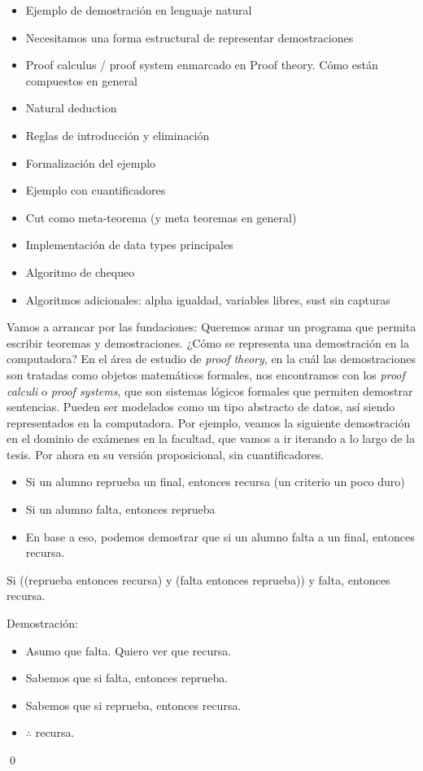 \begin{itemize}
    \item Ejemplo de demostración en lenguaje natural
    \item Necesitamos una forma estructural de representar demostraciones
    \item Proof calculus / proof system enmarcado en Proof theory. Cómo están
    compuestos en general
    \item Natural deduction
    \item Reglas de introducción y eliminación
    \item Formalización del ejemplo
    \item Ejemplo con cuantificadores
    \item Cut como meta-teorema (y meta teoremas en general)
    \item Implementación de data types principales
    \item Algoritmo de chequeo
    \item Algoritmos adicionales: alpha igualdad, variables libres, sust sin capturas
\end{itemize}

Vamos a arrancar por las fundaciones: Queremos armar un programa que permita
escribir teoremas y demostraciones. ¿Cómo se representa una demostración en la
computadora? En el área de estudio de \textit{proof theory}, en la cuál las
demostraciones son tratadas como objetos matemáticos formales, nos encontramos
con los \textit{proof calculi} o \textit{proof systems}, que son sistemas
lógicos formales que permiten demostrar sentencias. Pueden ser modelados como un
tipo abstracto de datos, así siendo representados en la computadora. Por
ejemplo, veamos la siguiente demostración en el dominio de exámenes en la
facultad, que vamos a ir iterando a lo largo de la tesis. Por ahora en su
versión proposicional, sin cuantificadores.

\begin{itemize}
    \item Si un alumno reprueba un final, entonces recursa (un criterio un poco duro)
    \item Si un alumno falta, entonces reprueba
    \item En base a eso, podemos demostrar que si un alumno falta a un final,
    entonces recursa.
\end{itemize}

\begin{ejemplo}\label{nd:ex:exam}
    Si ((reprueba entonces recursa) y (falta entonces reprueba)) y falta, entonces recursa.

    Demostración:
\begin{itemize}
    \item Asumo que falta. Quiero ver que recursa.
    \item Sabemos que si falta, entonces reprueba.
    \item Sabemos que si reprueba, entonces recursa.
    \item $\therefore$ recursa.
\end{itemize}
    \qed
\end{ejemplo}

